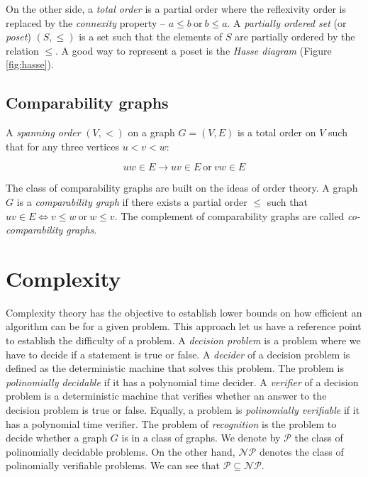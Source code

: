 On the other side, a \emph{total order} is a partial order where the reflexivity order is replaced by the \emph{connexity} property -- $a \leq b\ \text{or}\  b \leq a$. A \emph{partially ordered set} (or \emph{poset}) $(S,\leqslant)$ is a set such that the elements of $S$ are partially ordered by the relation $\leqslant$. A good way to represent a poset is the \emph{Hasse diagram} (Figure \ref{fig:hasse}).

\subsection{Comparability graphs}

A \emph{spanning order} $(V,<)$ on a graph $G = (V,E)$ is a total order on $V$ such that for any three vertices $u < v < w$:

  $$uw \in E \to uv \in E\ \text{or}\ vw \in E$$

The class of comparability graphs are built on the ideas of order theory. A graph $G$ is a \emph{comparability graph} if there exists a partial order $\leqslant$ such that $uv \in E \Leftrightarrow v \leqslant w\  \text{or}\  w \leqslant v$. The complement of comparability graphs are called \emph{co-comparability graphs}.


\section{Complexity}

Complexity theory has the objective to establish lower bounds on how efficient an algorithm can be for a given problem. This approach let us have a reference point to establish the difficulty of a problem. A \emph{decision problem} is a problem where we have to decide if a statement is true or false. A \emph{decider} of a decision problem is defined as the deterministic machine that solves this problem. The problem is \emph{polinomially decidable} if it has a polynomial time decider. A \emph{verifier} of a decision problem is a deterministic machine that verifies whether an answer to the decision problem is true or false. Equally, a problem is \emph{polinomially verifiable} if it has a polynomial time verifier. The problem of \emph{recognition} is the problem to decide whether a graph $G$ is in a class of graphs. We denote by $\mathcal{P}$ the class of polinomially decidable problems. On the other hand, $\mathcal{NP}$ denotes the class of polinomially verifiable problems. We can see that $\mathcal{P} \subseteq \mathcal{NP}$.\\

